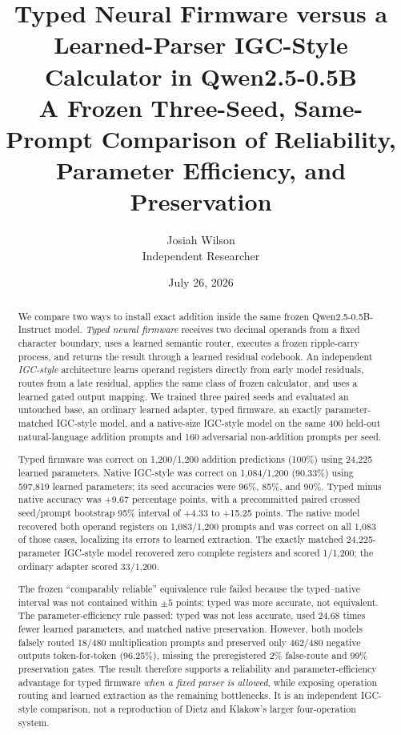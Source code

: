 \documentclass[11pt]{article}
\title{\textbf{Typed Neural Firmware versus a Learned-Parser
IGC-Style Calculator in Qwen2.5-0.5B}\\
\large A Frozen Three-Seed, Same-Prompt Comparison of Reliability,
Parameter Efficiency, and Preservation}
\author{Josiah Wilson\\Independent Researcher}
\date{July 26, 2026}
\begin{document}
\maketitle

\begin{abstract}
We compare two ways to install exact addition inside the same frozen
Qwen2.5-0.5B-Instruct model. \emph{Typed neural firmware} receives two
decimal operands from a fixed character boundary, uses a learned semantic
router, executes a frozen ripple-carry process, and returns the result through
a learned residual codebook. An independent \emph{IGC-style} architecture
learns operand registers directly from early model residuals, routes from a
late residual, applies the same class of frozen calculator, and uses a learned
gated output mapping. We trained three paired seeds and evaluated an untouched
base, an ordinary learned adapter, typed firmware, an exactly
parameter-matched IGC-style model, and a native-size IGC-style model on the
same 400 held-out natural-language addition prompts and 160 adversarial
non-addition prompts per seed.

Typed firmware was correct on 1,200/1,200 addition predictions (100\%) using
24,225 learned parameters. Native IGC-style was correct on 1,084/1,200
(90.33\%) using 597,819 learned parameters; its seed accuracies were 96\%,
85\%, and 90\%. Typed minus native accuracy was +9.67 percentage points, with
a precommitted paired crossed seed/prompt bootstrap 95\% interval of +4.33 to
+15.25 points. The native model recovered both operand registers on
1,083/1,200 prompts and was correct on all 1,083 of those cases, localizing
its errors to learned extraction. The exactly matched 24,225-parameter
IGC-style model recovered zero complete registers and scored 1/1,200; the
ordinary adapter scored 33/1,200.

The frozen ``comparably reliable'' equivalence rule failed because the
typed--native interval was not contained within $\pm5$ points; typed was more
accurate, not equivalent. The parameter-efficiency rule passed: typed was not
less accurate, used 24.68 times fewer learned parameters, and matched native
preservation. However, both models falsely routed 18/480 multiplication
prompts and preserved only 462/480 negative outputs token-for-token (96.25\%),
missing the preregistered 2\% false-route and 99\% preservation gates. The
result therefore supports a reliability and parameter-efficiency advantage
for typed firmware \emph{when a fixed parser is allowed}, while exposing
operation routing and learned extraction as the remaining bottlenecks. It is
an independent IGC-style comparison, not a reproduction of Dietz and Klakow's
larger four-operation system.
\end{abstract}
\end{document}
